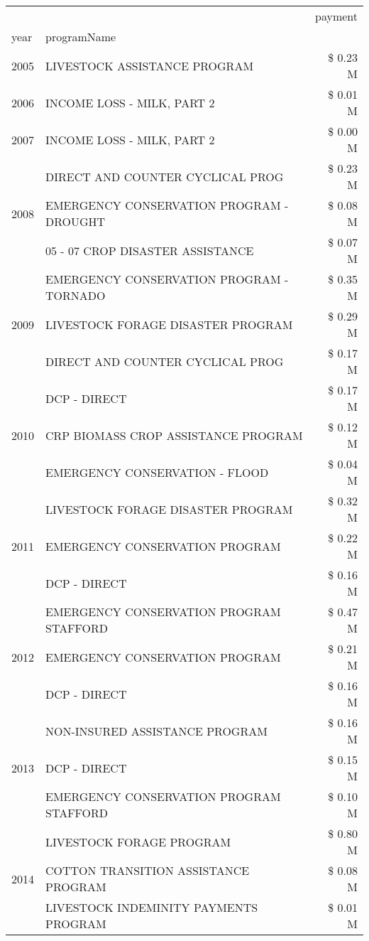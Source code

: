 \begin{tabular}{llr}
\toprule
 &  & payment \\
year & programName &  \\
\midrule
2005 & LIVESTOCK ASSISTANCE PROGRAM & \$ 0.23 M \\
\cline{1-3}
2006 & INCOME LOSS - MILK, PART 2 & \$ 0.01 M \\
\cline{1-3}
2007 & INCOME LOSS - MILK, PART 2 & \$ 0.00 M \\
\cline{1-3}
\multirow[t]{3}{*}{2008} & DIRECT AND COUNTER CYCLICAL PROG & \$ 0.23 M \\
 & EMERGENCY CONSERVATION PROGRAM - DROUGHT & \$ 0.08 M \\
 & 05 - 07 CROP DISASTER ASSISTANCE & \$ 0.07 M \\
\cline{1-3}
\multirow[t]{3}{*}{2009} & EMERGENCY CONSERVATION PROGRAM - TORNADO & \$ 0.35 M \\
 & LIVESTOCK FORAGE DISASTER  PROGRAM & \$ 0.29 M \\
 & DIRECT AND COUNTER CYCLICAL PROG & \$ 0.17 M \\
\cline{1-3}
\multirow[t]{3}{*}{2010} & DCP - DIRECT & \$ 0.17 M \\
 & CRP BIOMASS CROP ASSISTANCE PROGRAM & \$ 0.12 M \\
 & EMERGENCY CONSERVATION - FLOOD & \$ 0.04 M \\
\cline{1-3}
\multirow[t]{3}{*}{2011} & LIVESTOCK FORAGE DISASTER PROGRAM & \$ 0.32 M \\
 & EMERGENCY CONSERVATION PROGRAM & \$ 0.22 M \\
 & DCP - DIRECT & \$ 0.16 M \\
\cline{1-3}
\multirow[t]{3}{*}{2012} & EMERGENCY CONSERVATION PROGRAM STAFFORD & \$ 0.47 M \\
 & EMERGENCY CONSERVATION PROGRAM & \$ 0.21 M \\
 & DCP - DIRECT & \$ 0.16 M \\
\cline{1-3}
\multirow[t]{3}{*}{2013} & NON-INSURED ASSISTANCE PROGRAM & \$ 0.16 M \\
 & DCP - DIRECT & \$ 0.15 M \\
 & EMERGENCY CONSERVATION PROGRAM STAFFORD & \$ 0.10 M \\
\cline{1-3}
\multirow[t]{3}{*}{2014} & LIVESTOCK FORAGE PROGRAM & \$ 0.80 M \\
 & COTTON TRANSITION ASSISTANCE PROGRAM & \$ 0.08 M \\
 & LIVESTOCK INDEMINITY PAYMENTS PROGRAM & \$ 0.01 M \\

\end{tabular}
